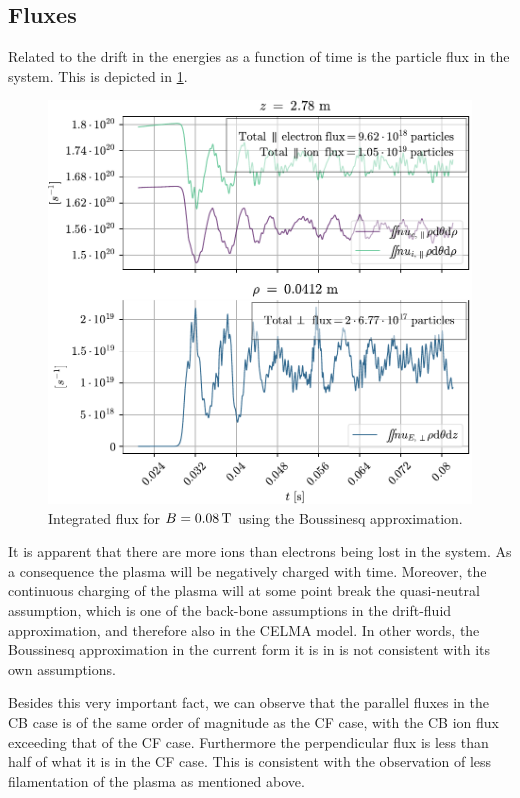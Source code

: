 \subsection{Fluxes}
%
Related to the drift in the energies as a function of time is the particle flux in the system.
This is depicted in \cref{fig:fluxB0008}.
%
\begin{figure}[htb]
    \centering
    \includegraphics{fig/results/compareBouss/flux0008B}
    \caption{Integrated flux for $B=0.08\, \text{T}$ using the Boussinesq approximation.}
    \label{fig:fluxB0008}
\end{figure}
%
It is apparent that there are more ions than electrons being lost in the system.
As a consequence the plasma will be negatively charged with time.
Moreover, the continuous charging of the plasma will at some point break the quasi-neutral assumption, which is one of the back-bone assumptions in the drift-fluid approximation, and therefore also in the CELMA model.
In other words, the Boussinesq approximation in the current form it is in is not consistent with its own assumptions.

Besides this very important fact, we can observe that the parallel fluxes in the CB case is of the same order of magnitude as the CF case, with the CB ion flux exceeding that of the CF case.
Furthermore the perpendicular flux is less than half of what it is in the CF case.
This is consistent with the observation of less filamentation of the plasma as mentioned above.


